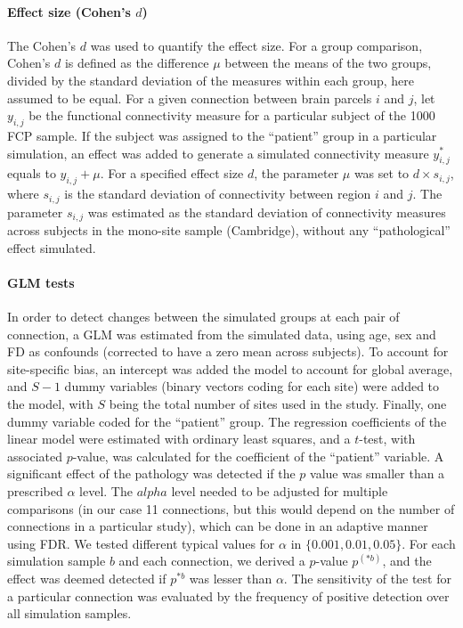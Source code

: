 \documentclass[authoryear]{elsarticle}
\begin{document}
\paragraph{Effect size (Cohen's $d$)}
The Cohen's $d$ was used to quantify the effect size. For a group comparison, Cohen's $d$ is defined as the difference $\mu$ between the means of the two groups, divided by the standard deviation of the measures within each group, here assumed to be equal. For a given connection between brain parcels $i$ and $j$, let $y_{i,j}$ be the functional connectivity measure for a particular subject of the 1000 FCP sample. If the subject was assigned to the ``patient'' group in a particular simulation, an effect was added to generate a simulated connectivity measure $y_{i,j}^*$ equals to $y_{i,j} + \mu$. For a specified effect size $d$, the parameter $\mu$ was set to $d\times s_{i,j}$, where $s_{i,j}$ is the standard deviation of connectivity between region $i$ and $j$. The parameter $s_{i,j}$ was estimated as the standard deviation of connectivity measures across subjects in the mono-site sample (Cambridge), without any ``pathological'' effect simulated.

\paragraph{GLM tests}
In order to detect changes between the simulated groups at each pair of connection, a GLM was estimated from the simulated data, using age, sex and FD as confounds (corrected to have a zero mean across subjects). To account for site-specific bias, an intercept was added the model to account for global average, and $S-1$ dummy variables (binary vectors coding for each site) were added to the model, with $S$ being the total number of sites used in the study. Finally, one dummy variable coded for the ``patient'' group. The regression coefficients of the linear model were estimated with ordinary least squares, and a $t$-test, with associated $p$-value, was calculated for the coefficient of the ``patient'' variable. A significant effect of the pathology was detected if the $p$ value was smaller than a prescribed $\alpha$ level. The $alpha$ level needed to be adjusted for multiple comparisons (in our case 11 connections, but this would depend on the number of connections in a particular study), which can be done in an adaptive manner using FDR. We tested different typical values for $\alpha$ in $\{0.001,0.01,0.05\}$. For each simulation sample $b$ and each connection, we derived a $p$-value $p^{(*b)}$, and the effect was deemed detected if $p^{*b}$ was lesser than $\alpha$. The sensitivity of the test for a particular connection was evaluated by the frequency of positive detection over all simulation samples.
\end{document}
